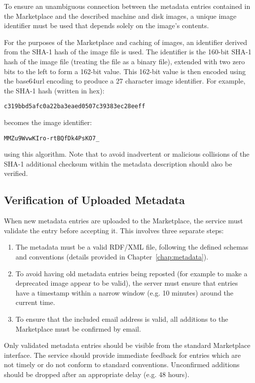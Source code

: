 To ensure an unambiguous connection between the metadata entries
contained in the Marketplace and the described machine and disk
images, a unique image identifier must be used that depends solely on
the image's contents.

For the purposes of the Marketplace and caching of images, an
identifier derived from the SHA-1 hash of the image file is used.  The
identifier is the 160-bit SHA-1 hash of the image file (treating the
file as a binary file), extended with two zero bits to the left to
form a 162-bit value.  This 162-bit value is then encoded using the
base64url encoding to produce a 27 character image identifier.  For
example, the SHA-1 hash (written in hex):
\begin{verbatim}
c319bbd5afc0a22ba3eaed0507c39383ec28eeff
\end{verbatim}
becomes the image identifier:
\begin{verbatim}
MMZu9WvwKIro-rtBQfDk4PsKO7_
\end{verbatim}
using this algorithm.  Note that to avoid inadvertent or malicious
collisions of the SHA-1 additional checksum within the metadata
description should also be verified.

\subsection{Verification of Uploaded Metadata}

When new metadata entries are uploaded to the Marketplace, the service
must validate the entry before accepting it.  This involves three
separate steps:
\begin{enumerate}
\item The metadata must be a valid RDF/XML file, following the defined
  schemas and conventions (details provided in
  Chapter~\ref{chap:metadata}).
\item To avoid having old metadata entries being reposted (for example
  to make a deprecated image appear to be valid), the server must
  ensure that entries have a timestamp within a narrow window (e.g. 10
  minutes) around the current time.
\item To ensure that the included email address is valid, all
  additions to the Marketplace must be confirmed by email.
\end{enumerate}
Only validated metadata entries should be visible from the standard
Marketplace interface.  The service should provide immediate feedback
for entries which are not timely or do not conform to standard
conventions.  Unconfirmed additions should be dropped after an
appropriate delay (e.g. 48 hours).

